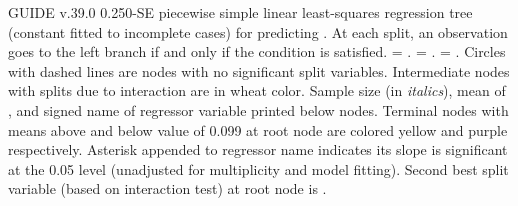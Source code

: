 \documentclass[12pt]{article}
\begin{document}
 \begin{center}
 \end{center}
GUIDE v.39.0 0.250-SE
piecewise simple linear least-squares regression tree
 (constant fitted to incomplete cases)
for predicting \texttt{}.
At each split, an observation goes to the left branch 
 if and only if the condition is satisfied.
\texttt{} = \texttt{}.
\texttt{} = \texttt{}.
\texttt{} = \texttt{}.
 Circles with dashed lines are nodes with no significant split variables.
 Intermediate nodes with splits due to interaction are in wheat color.
Sample size (in \emph{italics}), mean of \texttt{}, and signed name of regressor variable printed below nodes.
 Terminal nodes with means above and below value of  0.099  at root node are colored yellow and purple respectively.
 Asterisk appended to regressor name indicates its slope is significant at the 0.05 level (unadjusted for multiplicity and model fitting).
 Second best split variable (based on interaction test) at root node is \texttt{}.
 
\end{document}
